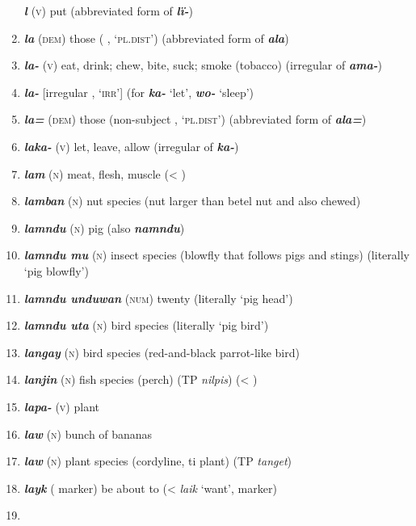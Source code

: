 \begin{enumerate}[noitemsep, label={}, align=left, widest=190, labelsep=1ex,leftmargin=*,itemindent=-10pt]
\textbf{\textit{l}} (\textsc{v}) put (abbreviated form of \textbf{\textit{lï-}}) \item 
\textbf{\textit{la}} (\textsc{dem}) those (  , ‘\textsc{pl.dist}’) (abbreviated form of \textbf{\textit{ala}}) \item 
\textbf{\textit{la-}} (\textsc{v}) eat, drink; chew, bite, suck; smoke (tobacco) (irregular   of \textbf{\textit{ama-}}) \item 
\textbf{\textit{la-}} [irregular  , ‘\textsc{irr}’] (for \textbf{\textit{ka-}} ‘let’, \textbf{\textit{wo-}} ‘sleep’) \item 
\textbf{\textit{la=}} (\textsc{dem}) those (non-subject   , ‘\textsc{pl.dist}’) (abbreviated form of \textbf{\textit{ala=}}) \item 
\textbf{\textit{laka-}} (\textsc{v}) let, leave, allow (irregular   of \textbf{\textit{ka-}}) \item 
\textbf{\textit{lam}} (\textsc{n}) meat, flesh, muscle (< ) \item 
\textbf{\textit{lamban}} (\textsc{n}) nut species (nut larger than betel nut and also chewed) \item 
\textbf{\textit{lamndu}} (\textsc{n}) pig (also \textbf{\textit{namndu}}) \item 
\textbf{\textit{lamndu mu}} (\textsc{n}) insect species (blowfly that follows pigs and stings) (literally ‘pig blowfly’) \item 
\textbf{\textit{lamndu unduwan}} (\textsc{num}) twenty (literally ‘pig head’) \item 
\textbf{\textit{lamndu uta}} (\textsc{n}) bird species (literally ‘pig bird’) \item 
\textbf{\textit{langay}} (\textsc{n}) bird species (red-and-black parrot-like bird) \item 
\textbf{\textit{lanjin}} (\textsc{n}) fish species (perch) (TP \textit{nilpis}) (< ) \item 
\textbf{\textit{lapa-}} (\textsc{v}) plant \item 
\textbf{\textit{law}} (\textsc{n}) bunch of bananas \item 
\textbf{\textit{law}} (\textsc{n}) plant species (cordyline, ti plant) (TP \textit{tanget}) \item 
\textbf{\textit{layk}} ( marker) be about to (<  \textit{laik} ‘want’,  marker) \item 

\end{enumerate}
